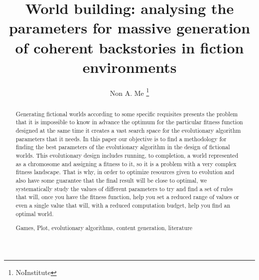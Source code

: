 \documentclass[runningheads,a4paper]{llncs}
\newcommand{\keywords}[1]{\par\addvspace\baselineskip
\noindent\keywordname\enspace\ignorespaces#1}
\begin{document}
\mainmatter  %

\title{World building: analysing the parameters for massive generation of coherent backstories in fiction environments}


%
%
\author{Non A. Me%
\thanks{NoInstitute}}
%


%
%

\maketitle


\begin{abstract}
Generating fictional worlds according to some specific requisites
presents the problem that it is impossible to know in advance the optimum for the
particular fitness function designed at the same time it creates a
vast search space for the evolutionary algorithm parameters that it
needs. In this paper our objective is to find a methodology for finding the
best parameters of the evolutionary algorithm in the design of
fictional worlds. This evolutionary design includes running, to
completion, a world represented as a chromosome and assigning a fitness to it, so it is a problem
with a very complex fitness landscape. That is why, in order to
optimize resources given to evolution and also have some guarantee
that the final result will be close to optimal, we systematically
study the values of different parameters to try and find a set of
rules that will, once you have the fitness function, help you set a
reduced range of values or even a single value that will, with a
reduced computation budget, help you find an optimal world.

\keywords{Games, Plot, evolutionary algorithms, content generation, literature}
\end{abstract}
\end{document}
